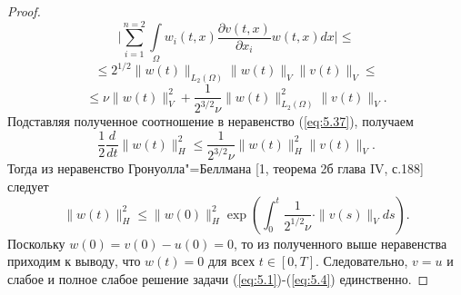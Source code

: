 \begin{proof}
    $$\bigg|\sum_{i=1}^{n=2}\int\limits_\Omega w_i(t, x)\frac{\partial v(t, x)}{\partial x_i}w(t, x)dx\bigg|\le$$
    $$\le 2^{1/2}\| w(t)\|_{L_2(\Omega)}\| w(t)\|_V\| v(t)\|_V\le$$
    $$\le \nu\| w(t)\|_V^2+\frac{1}{2^{3/2}\nu}\| w(t)\|_{L_2(\Omega)}^2\| v(t)\|_V.$$
    Подставляя полученное соотношение в неравенство (\ref{eq:5.37}), получаем
    $$\frac{1}{2}\frac{d}{dt}\| w(t)\|_H^2\le\frac{1}{2^{3/2}\nu}\| w(t)\|_H^2\| v(t)\|_V.$$
    Тогда из неравенство Гронуолла"=Беллмана [1, теорема 2б глава IV, с.188] следует
    $$\| w(t)\|_H^2\le\| w(0)\|_H^2\exp\left(\int_0^t\frac{1}{2^{1/2}\nu}\cdot\| v(s)\|_Vds\right).$$
    Поскольку $w(0) = v(0)- u(0) = 0$, то из полученного выше неравенства приходим к выводу,
    что $w(t)=0$ для всех $t\in[0, T]$. Следовательно, $v=u$ и слабое и полное слабое решение задачи (\ref{eq:5.1})-(\ref{eq:5.4}) единственно.
\end{proof}


\clearpage
{}
\nocite{*}
\printbibliography{}